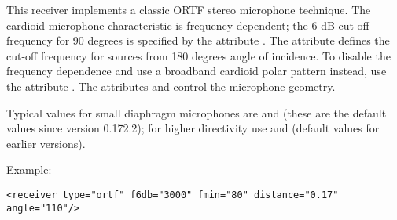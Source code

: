  
This receiver implements a classic ORTF stereo microphone
technique. The cardioid microphone characteristic is frequency
dependent; the 6 dB cut-off frequency for 90 degrees is specified by
the attribute . The attribute  defines the
cut-off frequency for sources from 180 degrees angle of incidence. To
disable the frequency dependence and use a broadband cardioid polar
pattern instead, use the attribute . The
attributes  and  control the
microphone geometry.

Typical values for small diaphragm microphones are 
and  (these are the default values since version
0.172.2); for higher directivity use 
and  (default values for earlier versions).





Example:

\begin{lstlisting}[numbers=none]
<receiver type="ortf" f6db="3000" fmin="80" distance="0.17" angle="110"/>
\end{lstlisting}

